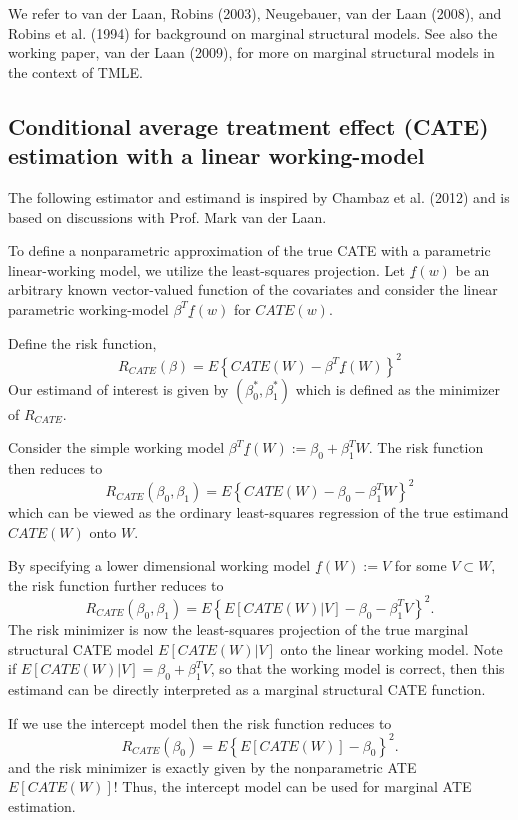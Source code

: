 \documentclass{article}
\begin{document}
We refer to van der Laan, Robins (2003), Neugebauer, van der Laan (2008), and Robins et al. (1994) for  background on marginal structural models. See also the working paper, van der Laan (2009), for more on marginal structural models in the context of TMLE.

\nocite{NEUGEBAUER2007419}
\nocite{vanderlaanunified}
\nocite{laan_rubin_2006}
\nocite{robinsCausal}

\subsection{Conditional average treatment effect (CATE) estimation with a linear working-model}
The following estimator and estimand is inspired by Chambaz et al. (2012) and is based on discussions with Prof. Mark van der Laan.\nocite{ChambazLaanVarimp}

To define a nonparametric approximation of the true CATE with a parametric linear-working model, we utilize the least-squares projection. Let $\underline{f}(w)$ be an arbitrary known vector-valued function of the covariates and consider the linear parametric working-model $\beta^T \underline{f}(w)$ for $CATE(w)$. 

Define the risk function,
$$R_{CATE}(\beta) = E \left\{CATE(W) - \beta^T \underline{f}(W)\right\}^2$$
Our estimand of interest is given by $(\beta_0^*, \beta_1^*)$ which is defined as the minimizer of $R_{CATE}$.

Consider the simple working model $\beta^T\underline{f}(W) := \beta_0 + \beta_1^T W$. The risk function then reduces to
$$R_{CATE}(\beta_0, \beta_1) = E \left\{CATE(W) - \beta_0 - \beta_1^T W\right\}^2$$
which can be viewed as the ordinary least-squares regression of the true estimand $CATE(W)$ onto $W$.

By specifying a lower dimensional working model $\underline{f}(W) := V$ for some $V \subset W$, the risk function further reduces to
$$R_{CATE}(\beta_0, \beta_1) = E \left\{E[CATE(W)|V] - \beta_0 - \beta_1^T V\right\}^2.$$
The risk minimizer is now the least-squares projection of the true marginal structural CATE model $E[CATE(W)|V]$ onto the linear working model. Note if $E[CATE(W)|V] =  \beta_0 + \beta_1^T V$, so that the working model is correct, then this estimand can be directly interpreted as a marginal structural CATE function.

If we use the intercept model then the risk function reduces to
$$R_{CATE}(\beta_0) = E \left\{E[CATE(W)] - \beta_0 \right\}^2.$$
and the risk minimizer is exactly given by the nonparametric ATE $E[CATE(W)]$! Thus, the intercept model can be used for marginal ATE estimation.
\end{document}

